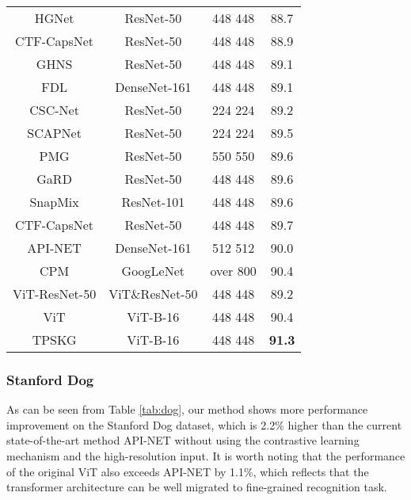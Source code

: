 \documentclass[5p,twocolumn]{elsarticle}
\begin{document}
\begin{table}[h]
{\begin{tabular}{|c|c|c|c|}
HGNet    \cite{CHEN2021}  & ResNet-50    & 448  448    & 88.7         \\
CTF-CapsNet \cite{Lin2021}  & ResNet-50    & 448  448    & 88.9         \\
GHNS \cite{Kim2021}         & ResNet-50    & 448  448    & 89.1       \\
FDL     \cite{Liu2020Filtration}  & DenseNet-161 & 448  448    & 89.1         \\
CSC-Net  \cite{Wang2020Category}  & ResNet-50 & 224  224    & 89.2         \\
SCAPNet \cite{Liu2021Learning} & ResNet-50 & 224  224    & 89.5         \\
PMG     \cite{Du2020Fine}  & ResNet-50    & 550  550    & 89.6         \\
GaRD \cite{Zhao_2021_CVPR}  & ResNet-50    & 448  448    & 89.6         \\
SnapMix \cite{Huang2021SnapMix} & ResNet-101    & 448  448    & 89.6         \\
CTF-CapsNet \cite{Lin2021}  & ResNet-50    & 448  448    & 89.7         \\
API-NET  \cite{Zhuang2020Learning} & DenseNet-161 & 512  512    & 90.0         \\
CPM   \cite{Ge2019Weakly} & GoogLeNet    & over 800   & 90.4         \\\hline
ViT-ResNet-50                             & ViT\&ResNet-50     & 448  448    & 89.2         \\
ViT   \cite{Dosovitskiy2021Image}    & ViT-B-16     & 448  448    & 90.4         \\
TPSKG      & ViT-B-16     & 448  448    & \textbf{91.3}         \\\hline
\end{tabular}}
\end{table}





\subsubsection{\textbf{Stanford Dog}}
As can be seen from Table \ref{tab:dog}, our method shows more performance improvement on the Stanford Dog dataset, which is 2.2\% higher than the current state-of-the-art method API-NET \cite{Zhuang2020Learning} without using the contrastive learning mechanism and the high-resolution input. It is worth noting that the performance of the original ViT also exceeds  API-NET by 1.1\%, which reflects that the transformer architecture can be well migrated to fine-grained recognition task. 
\end{document}

